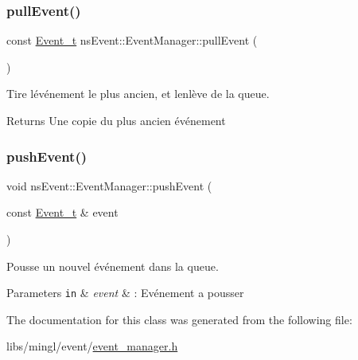 \subsubsection{\texorpdfstring{pull\+Event()}{pullEvent()}}
{\footnotesize\ttfamily const \hyperlink{structns_event_1_1_event__t}{Event\+\_\+t} ns\+Event\+::\+Event\+Manager\+::pull\+Event (\begin{DoxyParamCaption}{ }\end{DoxyParamCaption})}



Tire l\textquotesingle{}événement le plus ancien, et l\textquotesingle{}enlève de la queue. 

\begin{DoxyReturn}{Returns}
Une copie du plus ancien événement 
\end{DoxyReturn}
\mbox{\label{classns_event_1_1_event_manager_a1eff8398ddb0a25da82e52a1067b85b5}} 
\subsubsection{\texorpdfstring{push\+Event()}{pushEvent()}}
{\footnotesize\ttfamily void ns\+Event\+::\+Event\+Manager\+::push\+Event (\begin{DoxyParamCaption}\item[{const \hyperlink{structns_event_1_1_event__t}{Event\+\_\+t} \&}]{event }\end{DoxyParamCaption})}



Pousse un nouvel événement dans la queue. 


\begin{DoxyParams}[1]{Parameters}
\mbox{\tt in}  & {\em event} & \+: Evénement a pousser \\
\hline
\end{DoxyParams}


The documentation for this class was generated from the following file\+:\begin{DoxyCompactItemize}
\item 
libs/mingl/event/\hyperlink{event__manager_8h}{event\+\_\+manager.\+h}\end{DoxyCompactItemize}
